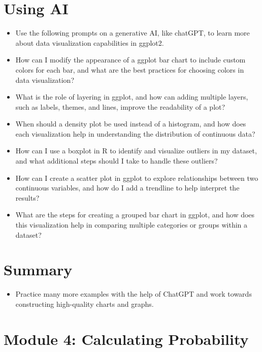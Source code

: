\documentclass[
  letterpaper,
  DIV=11,
  numbers=noendperiod]{scrreprt}
\providecommand{\tightlist}{%
  \setlength{\itemsep}{0pt}\setlength{\parskip}{0pt}}\usepackage{longtable,booktabs,array}
\begin{document}

\chapter{Using AI}\label{using-ai-2}

\begin{itemize}
\item
  Use the following prompts on a generative AI, like chatGPT, to learn
  more about data visualization capabilities in ggplot2.
\item
  How can I modify the appearance of a ggplot bar chart to include
  custom colors for each bar, and what are the best practices for
  choosing colors in data visualization?
\item
  What is the role of layering in ggplot, and how can adding multiple
  layers, such as labels, themes, and lines, improve the readability of
  a plot?
\item
  When should a density plot be used instead of a histogram, and how
  does each visualization help in understanding the distribution of
  continuous data?
\item
  How can I use a boxplot in R to identify and visualize outliers in my
  dataset, and what additional steps should I take to handle these
  outliers?
\item
  How can I create a scatter plot in ggplot to explore relationships
  between two continuous variables, and how do I add a trendline to help
  interpret the results?
\item
  What are the steps for creating a grouped bar chart in ggplot, and how
  does this visualization help in comparing multiple categories or
  groups within a dataset?
\end{itemize}


\chapter{Summary}\label{summary-3}

\begin{itemize}
\tightlist
\item
  Practice many more examples with the help of ChatGPT and work towards
  constructing high-quality charts and graphs.
\end{itemize}


\chapter{Module 4: Calculating
Probability}\label{module-4-calculating-probability}
\end{document}
